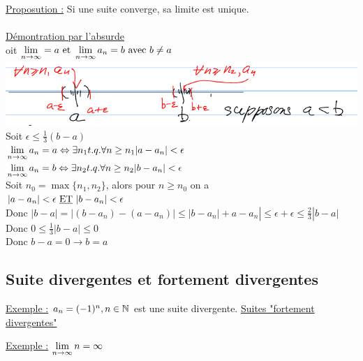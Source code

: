 \documentclass[12pt,a4paper]{article}
\begin{document}
{\underline{Proposution :} Si une suite converge, sa limite est unique.\\
\\
\underline{Démontration par l'absurde}\\
oit $\lim\limits_{n \to \infty} = a \text{ et } \lim\limits_{n \to \infty} a_n = b \text{ avec } b \neq a$
\includegraphics[scale=0.5]{illustrations_Analyse/suite_converge}\\
Soit $\epsilon \leq \frac{1}{3} (b-a)$\\
$\lim\limits_{n \to \infty} a_n = a \Leftrightarrow \exists n_1 t.q. \forall n \geq n_1 |a-a_n| < \epsilon$\\
$\lim\limits_{n \to \infty} a_n = b \Leftrightarrow \exists n_2 t.q. \forall n \geq n_2 |b-a_n| < \epsilon$\\
Soit $n_0 = \max\{n_1, n_2\}$, alors pour $n \geq n_0$ on a \\
$|a-a_n| < \epsilon \text{ \underline{ET} } |b-a_n| < \epsilon$\\
Donc $|b-a| = |(b-a_n) - (a-a_n)| \leq |b-a_n| + a-a_n| \leq \epsilon + \epsilon \leq \frac{2}{3}|b-a|$\\
Donc $0\leq \frac{1}{3}|b-a| \leq 0$\\
Donc $b-a = 0 \to b = a$

\subsection{Suite divergentes et fortement divergentes}
\begin{center}
\end{center}
\underline{Exemple :} $a_n = (-1)^n, n \in \mathbb{N}$ est une suite divergente.
\underline{Suites "fortement divergentes"}
\begin{center}
\end{center}
\underline{Exemple :} $\lim\limits_{n \to \infty} n = \infty$
\begin{center}
\end{center}

}
\end{document}
